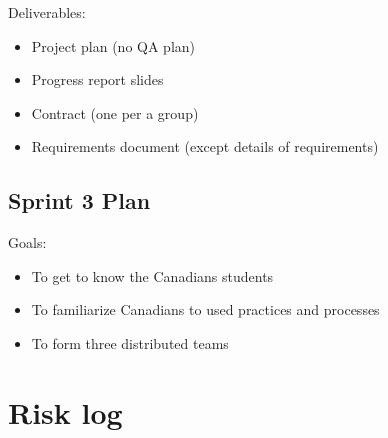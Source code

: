 \noindent Deliverables:
\begin{itemize}
\item Project plan (no QA plan)
\item Progress report slides
\item Contract (one per a group)
\item Requirements document (except details of requirements)
\end{itemize}

\subsection{Sprint 3 Plan}

Goals:
\begin{itemize}
\item To get to know the Canadians students
\item To familiarize Canadians to used practices and processes
\item To form three distributed teams

\end{itemize}

\section{Risk log}

